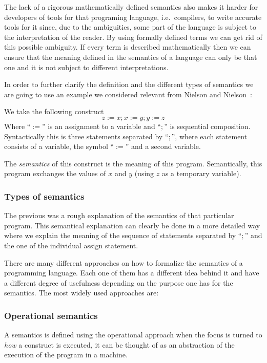 The lack of a rigorous mathematically defined semantics also makes it harder for developers of tools for that programing language, i.e.\ compilers, to write accurate tools for it since, due to the ambiguities, some part of the language is subject to the interpretation of the reader.
By using formally defined terms we can get rid of this possible ambiguity.
If every term is described mathematically then we can ensure that the meaning defined in the semantics of a language can only be that one and it is not subject to different interpretations.

In order to further clarify the definition and the different types of semantics we are going to use an example we considered relevant from Nielson and Nielson~\parencite{nielson}:

We take the following construct
\begin{equation*}
z:=x; x:=y; y:=z
\end{equation*}
Where ``$:=$'' is an assignment to a variable and ``$;$'' is sequential composition.
Syntactically this is three statements separated by ``$;$'', where each statement consists of a variable, the symbol ``$:=$'' and a second variable.

The \textit{semantics} of this construct is the meaning of this program.
Semantically, this program exchanges the values of $x$ and $y$ (using $z$ as a temporary variable).

\subsubsection{Types of semantics}

The previous was a rough explanation of the semantics of that particular program.
This semantical explanation can clearly be done in a more detailed way where we explain the meaning of the sequence of statements separated by ``$;$'' and the one of the individual assign statement.

There are many different approaches on how to formalize the semantics of a programming language.
Each one of them has a different idea behind it and have a different degree of usefulness depending on the purpose one has for the semantics.
The most widely used approaches are:


\subsubsection{Operational semantics}

A semantics is defined using the operational approach when the focus is turned to \textit{how} a construct is executed, it can be thought of as an abstraction of the execution of the program in a machine.~\parencite{nielson}

